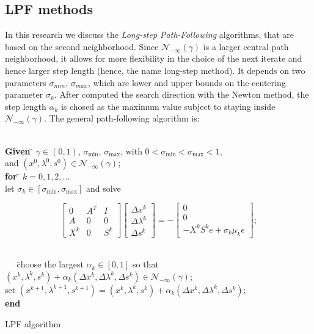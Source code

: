 \documentclass[a4paper,10 pt,titlepage,twoside]{book}
\theoremstyle{plain}
\theoremstyle{definition}
\theoremstyle{remark}
\begin{document}
\subsection*{LPF methods}
In this research we discuss the \textit{Long-step Path-Following} algorithms, that are based on the second neighborhood. Since  $\mathcal{N}_{-\infty}(\gamma)$ is a larger central path neighborhood, it allows for more flexibility in the choice of the next iterate and hence larger step length (hence, the name long-step method). It depends on two parameters $\sigma_{min}$, $\sigma_{max}$, which are lower and upper bounds on the centering parameter $\sigma_{k}$. After computed the search direction with the Newton method, the step length $\alpha_{k}$ is chosed as the maximum value subject to staying inside $\mathcal{N}_{-\infty}(\gamma)$.
The general path-following algorithm is:
\begin{algorithm}[H]
	\begin{tabbing}
		\\
		\textbf{Given  }\= $\gamma\in(0,1)$, $\sigma_{\text{min}}$, $\sigma_{\text{max}}$, with $0<\sigma_{\text{min}}< \sigma_{\text{max}}<1$,\\
		\> and $(x^{0}, \lambda^{0}, s^{0})\in\mathcal{N}_{-\infty}(\gamma)$;\\
		\textbf{for} \= $k = 0, 1, 2,...$ \\
		\> let $\sigma_{k}\in[\sigma_{\text{min}},\sigma_{\text{max}}]$ and solve
	\end{tabbing}
	\begin{equation}\label{Pb}
	\begin{bmatrix}
	0&A^{T}&I \\A&0&0\\X^{k}&0&S^{k}
	\end{bmatrix}\begin{bmatrix}
	\Delta x^{k}\\\Delta\lambda^{k} \\\Delta s^{k}
	\end{bmatrix}=-\begin{bmatrix}
	0\\0\\-X^{k}S^{k}e + \sigma_{k}\mu_{k}e
	\end{bmatrix};
	\end{equation}
	\begin{tabbing}
		\\
		$\;\;\;\;\;$\=choose the largest $\alpha_{k}\in[0,1]$ so that $(x^{k}, \lambda^{k}, s^{k})+ \alpha_{k}(\Delta x^{k}, \Delta\lambda^{k}, \Delta s^{k})\in\mathcal{N}_{-\infty}(\gamma)$; \\
		\>set $(x^{k+1}, \lambda^{k+1}, s^{k+1}) = (x^{k}, \lambda^{k}, s^{k})+ \alpha_{k}(\Delta x^{k}, \Delta\lambda^{k}, \Delta s^{k})$;\\
		
		\textbf{end}
	\end{tabbing}
	\caption{LPF algorithm}
\end{algorithm}
\end{document}
